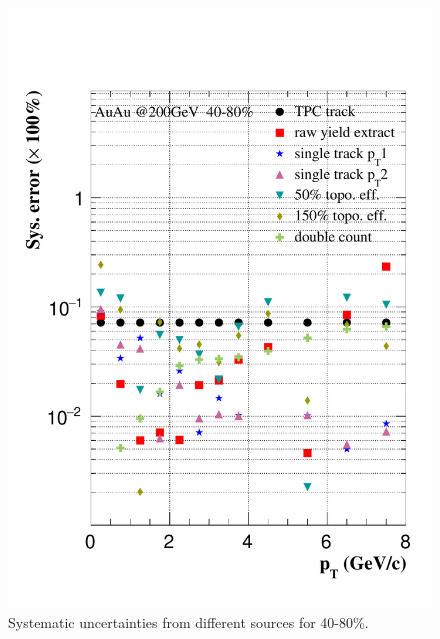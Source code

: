 \begin{figure}[htbp]
\begin{minipage}[htbp]{0.47\linewidth}
\centering
\includegraphics[width=1.0\textwidth,angle=0]{figure/Run14_D0HFT/sysErr_40_80.pdf}
\caption{ Systematic uncertainties from different sources for 40-80\%. \label{sysErr_40_80}}
\end{minipage}
\hfill
\begin{minipage}[htbp]{0.47\linewidth}
\centering

\end{minipage}
\end{figure}
